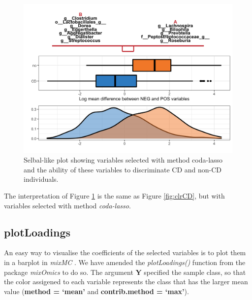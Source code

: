 \documentclass[openany]{book}
\begin{document}
\begin{figure}

{\centering \includegraphics[width=1\linewidth]{./Generated_plots/codaCD-1} 

}

\caption{Selbal-like plot showing variables selected with method coda-lasso and the ability of these variables to discriminate CD and non-CD individuals.}\label{fig:codaCD}
\end{figure}

The interpretation of Figure \ref{fig:codaCD} is the same as Figure
\ref{fig:clrCD}, but with variables selected with method
\emph{coda-lasso}.

\subsection{plotLoadings}\label{plotloadings}

An easy way to visualise the coefficients of the selected variables is
to plot them in a barplot in \emph{mixMC} \citep{rohart2017mint}. We
have amended the \emph{plotLoadings()} function from the package
\emph{mixOmics} to do so. The argument \textbf{Y} specified the sample
class, so that the color assigened to each variable represents the class
that has the larger mean value (\textbf{method = `mean'} and
\textbf{contrib.method = `max'}).
\end{document}
